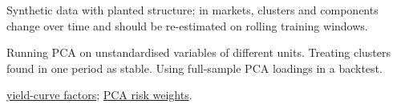 \begin{qfmethod}
 Synthetic data with planted structure; in markets, clusters and components change over time and should be re-estimated on rolling training windows.

 Running PCA on unstandardised variables of different units. Treating clusters found in one period as stable. Using full-sample PCA loadings in a backtest.

 \hyperref[meth:yield-curve-factor-exposures]{yield-curve factors}; \hyperref[mod:pca-risk-distribution-weights]{PCA risk weights}.

\end{qfmethod}
